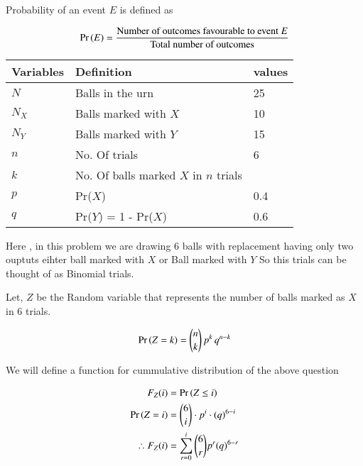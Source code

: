\documentclass[journal,12pt,twocolumn]{IEEEtran}
\begin{document}
Probability of an event $E$ is defined as


$$\Pr\left(E\right) = \frac{\text{Number of outcomes favourable to event }E}{\text{Total number of outcomes}}$$

\begin{table}[htp]
	\begin{tabular}{|l|l|l|}\hline
		Variables	&Definition &values\\ \hline
		$N$ &Balls in the urn & 25\\ \hline
		$N_X$ &Balls marked with $X$ & 10\\ \hline
		$N_Y$ &Balls marked with $Y$ & 15\\ \hline
		$n$	&No. Of trials & 6\\ \hline
		$k$	&No. Of balls marked $X$ in $n$ trials & \\ \hline
		$p$	&Pr($X$) & 0.4\\ \hline
		$q$	&Pr($Y$) = 1 - Pr($X$) & 0.6\\	\hline
		
	\end{tabular}
\end{table}



Here , in this problem we are drawing 6 balls with replacement having only two ouptuts eihter ball marked with $X$ or Ball marked with $Y$ So this trials can be thought of as Binomial trials. 


Let, $Z$ be the Random variable that represents the number of balls marked as $X$ in 6 trials.


$$\Pr\left(Z = k\right) = \binom{n}{k}\,p^k\,q^{n-k}$$

We will define a function for cummulative distribution of the above question

\begin{align} 
	F_Z(i)&=\Pr\left(Z\leq i\right)\\
	\Pr\left(Z=i\right)&= \binom{6}{i} \cdot p^i \cdot (q)^{6-i}\\
	\therefore   
	F_Z(i)&=\sum_{r=0}^i{\binom{6}{r}}p^r(q)^{6-r}
\end{align}



%
\end{document}
